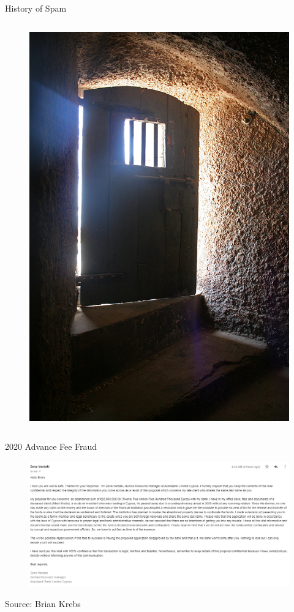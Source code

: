 \documentclass[nobackground,dvipsnames,table]{beamer}
\begin{document}
\begin{frame}{History of Spam}
\begin{columns}
            \begin{figure}
                \centering
                \includegraphics[width=\textwidth]{prison-door}
            \end{figure}
    \end{columns}
\end{frame}

\begin{frame}{2020 Advance Fee Fraud}
    \begin{figure}
        \centering
        \includegraphics[width=\textwidth]{advance-fee-fraud}
    \end{figure}
    Source: Brian Krebs
\end{frame}
\end{document}
